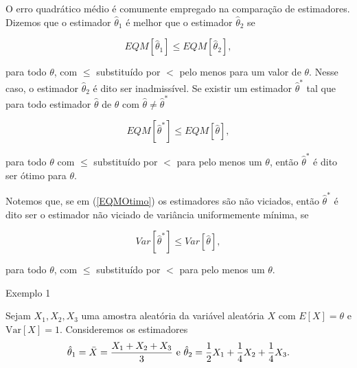 \documentclass[12pt]{beamer}
\begin{document}
\begin{frame}{}
\begin{block}{}
\justifying
O erro quadrático médio é comumente empregado na comparação de estimadores. Dizemos que o estimador $\hat{\theta}_1$ é melhor que o estimador $\hat{\theta}_2$ se

\begin{equation}
EQM[\hat{\theta}_1] \leq EQM[\hat{\theta}_2],
\end{equation}

para todo $\theta$, com $\leq$ substituído por $<$ pelo menos para um valor de $\theta$. Nesse caso, o estimador $\hat{\theta}_2$ é dito ser inadmissível. Se existir um estimador $\hat{\theta}^{*}$ tal que para todo estimador $\hat{\theta}$ de $\theta$ com $\hat{\theta} \neq \hat{\theta}^{*}$

\begin{equation}\label{EQMOtimo}
EQM[\hat{\theta}^{*}] \leq EQM[\hat{\theta}],
\end{equation}

para todo $\theta$ com $\leq$ substituído por $<$ para pelo menos um $\theta$, então $\hat{\theta}^{*}$ é dito ser ótimo para $\theta$. 
\end{block}
\end{frame}

\begin{frame}{}
\begin{block}{}
\justifying
Notemos que, se em (\ref{EQMOtimo}) os estimadores são não viciados, então $\hat{\theta}^{*}$ é dito ser o estimador não viciado de variância uniformemente mínima, se

\begin{equation}
Var[\hat{\theta}^{*}] \leq Var[\hat{\theta}],
\end{equation}

para todo $\theta$, com $\leq$ substituído por $<$ para pelo menos um $\theta$.
\end{block}
\end{frame}

\begin{frame}{Exemplo 1}
\begin{block}{}
\justifying
Sejam $X_1, X_2, X_3$ uma amostra aleatória da variável aleatória $X$ com $E[X] = \theta$ e $\mathrm{Var}[X] = 1$. Consideremos os estimadores 
\begin{align*}
    \hat{\theta}_1 = \Bar{X} = \frac{X_1 + X_2 + X_3}{3}~\textrm{e}~\hat{\theta}_2 = \frac{1}{2}X_1 + \frac{1}{4}X_2 + \frac{1}{4}X_3.
\end{align*}
\end{block}
\end{frame}
\end{document}
